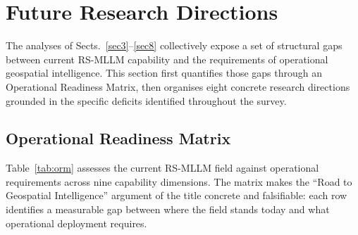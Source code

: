 
\section{Future Research Directions}\label{sec9}

The analyses of Sects.~\ref{sec3}--\ref{sec8} collectively expose a set of
structural gaps between current RS-MLLM capability and the requirements of
operational geospatial intelligence. This section first quantifies those
gaps through an Operational Readiness Matrix, then organises eight concrete
research directions grounded in the specific deficits identified throughout
the survey.

\subsection{Operational Readiness Matrix}\label{sec9:orm}

Table~\ref{tab:orm} assesses the current RS-MLLM field against operational
requirements across nine capability dimensions. The matrix makes the
``Road to Geospatial Intelligence'' argument of the title concrete and
falsifiable: each row identifies a measurable gap between where the field
stands today and what operational deployment requires.

